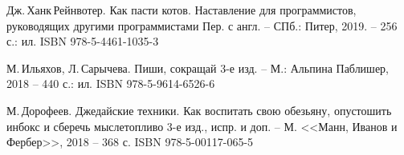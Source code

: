 \begingroup

	\begin{thebibliography}{00}

		Дж.\,Ханк\,Рейнвотер.
		Как пасти котов. Наставление для программистов, руководящих другими программистами
		Пер. с англ. -- СПб.: Питер, 2019. --
		256 с.: ил.
		ISBN 978-5-4461-1035-3
		
		М.\,Ильяхов, Л.\,Сарычева.
		Пиши, сокращай
		3-е изд. -- М.: Альпина Паблишер, 2018 --
		440 с.: ил.
		ISBN 978-5-9614-6526-6

		М.\,Дорофеев.
		Джедайские техники. Как воспитать свою обезьяну, опустошить инбокс и сберечь мыслетопливо
		3-е изд., испр. и доп. -- М. <<Манн, Иванов и Фербер>>, 2018 --
		368 с.
		ISBN 978-5-00117-065-5

	\end{thebibliography}

\endgroup

\clearpage